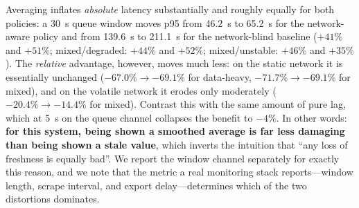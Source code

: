 Averaging inflates \emph{absolute} latency substantially and roughly equally for both policies:
a \SI{30}{\second} queue window moves p95 from \SI{46.2}{\second} to \SI{65.2}{\second} for the
network-aware policy and from \SI{139.6}{\second} to \SI{211.1}{\second} for the network-blind
baseline ($+41\%$ and $+51\%$; mixed/degraded: $+44\%$ and $+52\%$; mixed/unstable: $+46\%$ and
$+35\%$). The \emph{relative} advantage, however, moves much less: on the static network it is
essentially unchanged ($-67.0\%\rightarrow-69.1\%$ for data-heavy, $-71.7\%\rightarrow-69.1\%$
for mixed), and on the volatile network it erodes only moderately
($-20.4\%\rightarrow-14.4\%$ for mixed). Contrast this with the same amount of pure lag, which
at \SI{5}{\second} on the queue channel collapses the benefit to $-4\%$. In other words:
\textbf{for this system, being shown a smoothed average is far less damaging than being shown a
stale value}, which inverts the intuition that ``any loss of freshness is equally bad''. We
report the window channel separately for exactly this reason, and we note that the metric a real
monitoring stack reports---window length, scrape interval, and export delay---determines which of
the two distortions dominates.

